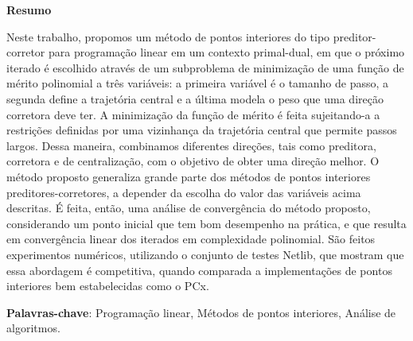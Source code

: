 \begin{center}
  \large{\textbf{Resumo}}
\end{center}

Neste trabalho, propomos um método de pontos interiores do tipo preditor-corretor para programação linear em um contexto primal-dual, em que o próximo iterado é escolhido através de um subproblema de minimização de uma função de mérito polinomial a três variáveis: a primeira variável é o tamanho de passo, a segunda define a trajetória central e a última modela o peso que uma direção corretora deve ter.  A minimização da função de mérito é feita  sujeitando-a a restrições  definidas por uma vizinhança da trajetória central que permite passos largos. Dessa maneira, combinamos diferentes direções, tais como preditora, corretora e de centralização, com o objetivo de obter uma direção melhor. O método proposto generaliza grande parte dos métodos de pontos interiores preditores-corretores, a depender da escolha do valor das variáveis  acima descritas. É feita, então, uma análise de convergência do método proposto, considerando um ponto inicial que tem bom desempenho na prática, e que resulta em convergência linear dos iterados em complexidade polinomial. São feitos experimentos numéricos, utilizando o conjunto de testes Netlib, que mostram que essa abordagem é competitiva, quando comparada a implementações de pontos interiores bem estabelecidas como o PCx.





\textbf{Palavras-chave}:
Programação linear, Métodos de pontos interiores, Análise de algoritmos.
